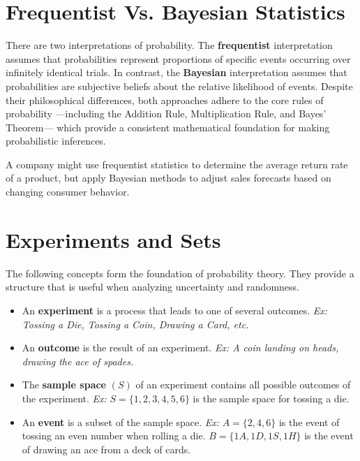 \documentclass[
  11pt,
  letterpaper,
  DIV=11,
  numbers=noendperiod,
  oneside,
  open=any]{scrreprt}
\begin{document}
\section{Frequentist Vs. Bayesian
Statistics}\label{frequentist-vs.-bayesian-statistics}

There are two interpretations of probability. The \textbf{frequentist}
interpretation assumes that probabilities represent proportions of
specific events occurring over infinitely identical trials. In contrast,
the \textbf{Bayesian} interpretation assumes that probabilities are
subjective beliefs about the relative likelihood of events. Despite
their philosophical differences, both approaches adhere to the core
rules of probability ---including the Addition Rule, Multiplication
Rule, and Bayes' Theorem--- which provide a consistent mathematical
foundation for making probabilistic inferences.

\begin{bsexample}[Example]

A company might use frequentist statistics to determine the average
return rate of a product, but apply Bayesian methods to adjust sales
forecasts based on changing consumer behavior.

\end{bsexample}

\section{Experiments and Sets}\label{experiments-and-sets}

The following concepts form the foundation of probability theory. They
provide a structure that is useful when analyzing uncertainty and
randomness.

\begin{itemize}
\item
  An \textbf{experiment} is a process that leads to one of several
  outcomes. \emph{Ex: Tossing a Die, Tossing a Coin, Drawing a Card,
  etc.}
\item
  An \textbf{outcome} is the result of an experiment. \emph{Ex: A coin
  landing on heads, drawing the ace of spades.}
\item
  The \textbf{sample space} \((S)\) of an experiment contains all
  possible outcomes of the experiment. \emph{Ex:} \(S=\{1,2,3,4,5,6\}\)
  is the sample space for tossing a die.
\item
  An \textbf{event} is a subset of the sample space. \emph{Ex:}
  \(A=\{2,4,6\}\) is the event of tossing an even number when rolling a
  die. \(B=\{1A,1D,1S,1H\}\) is the event of drawing an ace from a deck
  of cards.
\end{itemize}
\end{document}
